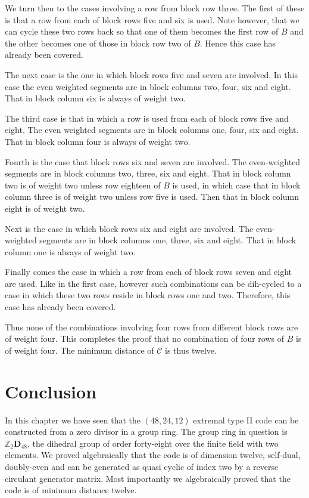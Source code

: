 We turn then to the cases involving a row from block row three.
The first of these is that a row from each of block rows five and six is used.
Note however, that we can cycle these two rows back so that one of them becomes the first row of $B$ and the other becomes one of those in block row two of $B$.
Hence this case has already been covered.

The next case is the one in which block rows five and seven are involved.
In this case the even weighted segments are in block columns two, four, six and eight.
That in block column six is always of weight two.

The third case is that in which a row is used from each of block rows five and eight.
The even weighted segments are in block columns one, four, six and eight.
That in block column four is always of weight two.

Fourth is the case that block rows six and seven are involved.
The even-weighted segments are in block columns two, three, six and eight.
That in block column two is of weight two unless row eighteen of $B$ is used, in which case that in block column three is of weight two unless row five is used.
Then that in block column eight is of weight two.

Next is the case in which block rows six and eight are involved.
The even-weighted segments are in block columns one, three, six and eight.
That in block column one is always of weight two.

Finally comes the case in which a row from each of block rows seven and eight are used.
Like in the first case, however such combinations can be dih-cycled to a case in which these two rows reside in block rows one and two.
Therefore, this case has already been covered.

Thus none of the combinations involving four rows from different block rows are of weight four.
This completes the proof that no combination of four rows of $B$ is of weight four.
The minimum distance of $\mathcal{C}$ is thus twelve.

\section*{Conclusion}
In this chapter we have seen that the $(48,24,12)$ extremal type II code can be constructed from a zero divisor in a group ring.
The group ring in question is $\mathbb{Z}_2 \mathbf{D}_{48}$, the dihedral group of order forty-eight over the finite field with two elements.
We proved algebraically that the code is of dimension twelve, self-dual, doubly-even and can be generated as quasi cyclic of index two by a reverse circulant generator matrix.
Most importantly we algebraically proved that the code is of minimum distance twelve.

